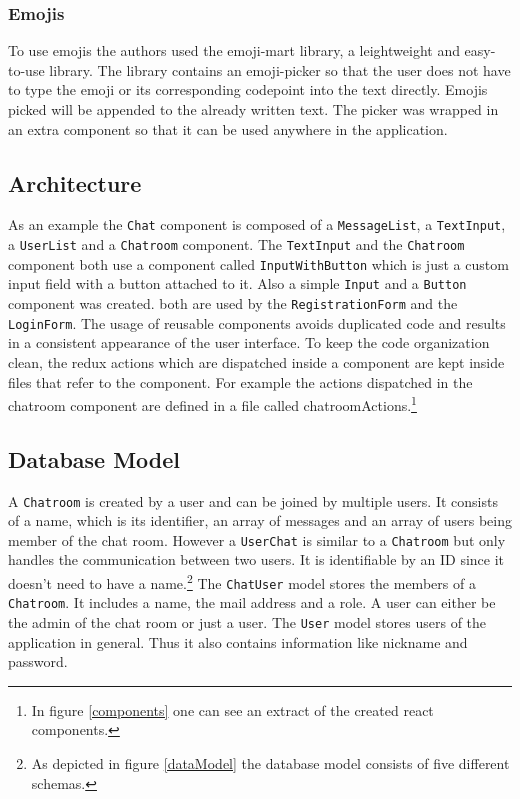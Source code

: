\subsubsection{Emojis}
To use emojis the authors used the emoji-mart library, a leightweight and easy-to-use library. The library contains an emoji-picker so that the user does not have to type the emoji or its corresponding codepoint into the text directly. Emojis picked will be appended to the already written text. The picker was wrapped in an extra component so that it can be used anywhere in the application.

\subsection{Architecture}
As an example the \texttt{Chat} component is composed of a \texttt{MessageList}, a \texttt{TextInput}, a \texttt{UserList} and a \texttt{Chatroom} component.
The \texttt{TextInput} and the \texttt{Chatroom} component both use a component called \texttt{InputWithButton} which is just a custom input field with a button attached to it. Also a simple \texttt{Input} and a \texttt{Button} component was created. both are used by the \texttt{RegistrationForm} and the \texttt{LoginForm}.
The usage of reusable components avoids duplicated code and results in a consistent appearance of the user interface.
To keep the code organization clean, the redux actions which are dispatched inside a component are kept inside files that refer to the component. For example the actions dispatched in the chatroom component are defined in a file called chatroomActions.\footnote{In figure \ref{components} one can see an extract of the  created react components.}

\subsection{Database Model}
A \texttt{Chatroom} is created by a user and can be joined by multiple users. It consists of a name, which is its identifier, an array of messages and an array of users being member of the chat room. 
However a \texttt{UserChat} is similar to a \texttt{Chatroom} but only handles the communication between two users. It is identifiable by an ID since it doesn’t need to have a name.\footnote{As depicted in figure \ref{dataModel} the database model consists of five different schemas.}
The  \texttt{ChatUser} model stores the members of a  \texttt{Chatroom}. It includes a name, the mail address and a role. A user can either be the admin of the chat room or just a user.
The  \texttt{User} model stores users of the application in general. Thus it also contains information like nickname and password.


